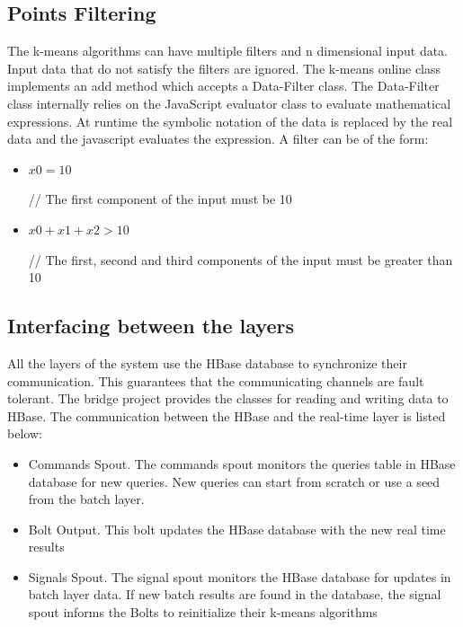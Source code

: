 \documentclass{lmproj}
\begin{document}
\subsection{Points Filtering}

The k-means algorithms can have multiple filters and n dimensional input data. Input data that do not satisfy the filters are ignored. The k-means online class implements an add method which accepts a Data-Filter class. The Data-Filter class internally relies on the JavaScript evaluator class to evaluate mathematical expressions. At runtime the symbolic notation of the data is replaced by the real data and the javascript evaluates the expression. A filter can be of the form:

 \begin{itemize}
 	\item
 	\begin{minipage}[t]{0.3\linewidth}
 		$x0 = 10$
 	\end{minipage}%
 	\begin{minipage}{.7\linewidth}
		// The first component of the input must be 10
 	\end{minipage}
 
 
 	\item
 	\begin{minipage}[t]{0.3\linewidth}
	 	$x0 + x1 + x2 > 10$
 	\end{minipage}%
 	\begin{minipage}{.7\linewidth}
 		// The first, second and third components of the input must be greater than 10
 	\end{minipage}
 \end{itemize}


\subsection{Interfacing between the layers}

All the layers of the system use the HBase database to synchronize their communication. This guarantees that the communicating channels are fault tolerant. The bridge project provides the classes for reading and writing data to HBase. The communication between the HBase and the real-time layer is listed below:

\begin{itemize}
	\item Commands Spout. The commands spout monitors the queries table in HBase database for new queries.  New queries can start from scratch or use a seed from the batch layer. 
	\item Bolt Output. This bolt updates the HBase database with the new real time results
	\item Signals Spout. The signal spout monitors the HBase database for updates in batch layer data. If new batch results are found in the database, the signal spout informs the Bolts to reinitialize their k-means algorithms 
\end{itemize}
\end{document}
